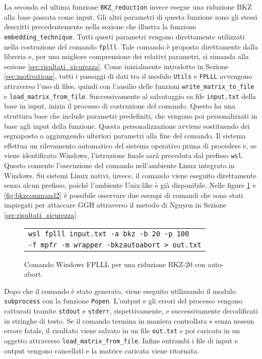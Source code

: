 La seconda ed ultima funzione \texttt{BKZ\_reduction} invece esegue una riduzione BKZ alla 
base passata come input. Gli altri parametri di questa funzione sono gli stessi 
descritti precedentemente nella sezione che illustra la funzione \texttt{embedding\_technique}. 
Tutti questi parametri vengono direttamente utilizzati nella costruzione del comando 
\texttt{fplll}. Tale comando è proposto direttamente dalla libreria e, per una migliore 
comprensione dei relativi parametri, si rimanda alla sezione \ref{sec:risultati_sicurezza}.
Come inizialmente introdotto in Sezione \ref{sec:motivations}, tutti i passaggi di dati 
tra il modulo \texttt{Utils} e \texttt{FPLLL} avvengono attraverso l'uso di files, quindi 
con l'ausilio delle funzioni \texttt{write\_matrix\_to\_file} e \texttt{load\_matrix\_from\_file}.
Successivamente al salvataggio su file \texttt{input.txt} della base in input, inizia
il processo di costruzione del comando. 
Questo ha una struttura base che include parametri predefiniti, che vengono poi personalizzati 
in base agli input della funzione. Questa personalizzazione avviene sostituendo dei 
segnaposto o aggiungendo ulteriori parametri alla fine del comando. 
Il sistema effettua un rilevamento automatico del sistema operativo prima di procedere e,  
se viene identificato Windows, l'istruzione finale sarà preceduta dal prefisso \texttt{wsl}. 
Questo consente l'esecuzione del comando nell'ambiente Linux integrato in Windows. 
Su sistemi Linux nativi, invece, il comando viene eseguito 
direttamente senza alcun prefisso, poiché l'ambiente Unix-like è già disponibile.
Nelle figure 
\ref{fig:bkzcommand1} e \ref{fig:bkzcommand2} è possibile osservare due esempi di comandi
che sono stati impiegati per attaccare GGH attraverso il metodo di Nguyen in Sezione 
\ref{sec:risultati_sicurezza}.  


\begin{figure}[h]
    \centering
    \begin{tabular}{l}
        \texttt{wsl fplll input.txt -a bkz -b 20 -p 100} \\
        \texttt{-f mpfr -m wrapper -bkzautoabort > out.txt}
    \end{tabular}
    \caption[Comando Linux FPLLL per BKZ-20.]
    {Comando Windows FPLLL per una riduzione BKZ-20 con auto-abort.}
    \label{fig:bkzcommand1}
\end{figure}

Dopo che il comando è stato generato, viene eseguito utilizzando il modulo \texttt{subprocess}
con la funzione \texttt{Popen}. 
L'output e gli errori del processo vengono catturati tramite \texttt{stdout} e \texttt{stderr}, 
rispettivamente, e successivamente decodificati in stringhe di testo.
Se il comando termina in maniera controllata e senza nessun errore fatale, il risultato
viene salvato in un file \texttt{out.txt} e poi caricato in un oggetto attraverso
\texttt{load\_matrix\_from\_file}. 
Infine entrambi i file di input e output vengono cancellati e la matrice caricata viene
ritornata. 

